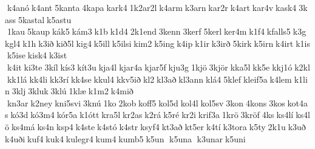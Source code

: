 k4anó k4ant 5kanta 4kapa kark4 1k2ar2l k4arm k3arn kar2r k4art kar4v kask4 3kass 5kastal k5astu  1kau 5kaup kák5 kám3 k1b k1d4 2k1end 3kenn 3kerf 5kerl ker4m k1f4 kfalls5 k3g kgl4 k1h k3ið kið5l kig4 k5ill k5ilsi kim2 k5ing k4ip k1ir k3irð 5kirk k5irn k4irt k1is k5ise kisk4 k3ist  k4it ki3te 3kíl kís3 kít3u kja4l kjar4a kjar5f kju3g 1kjö 3kjör kka5l kk5e kkj1ó k2kl kk1lá kk4li kk3rí kk4se kkul4 kkv5ið kl2 kl3að kl3ann klá4 5klef kleif5a k4lem k1lin 3klj 3kluk 3klú 1klæ k1m2 k4mið  kn3ar k2ney kni5svi 3knú 1ko 2kob koff5 kol5d kol4l kol5sv 3kon 4kons 3kos kot4as kó3d kó3m4 kór5a k1ótt kra5l kr2as k2rá k5ré kr2i krif3a 1krö 3kröf 4ks ks4lí ks4lö ks4má ks4n ksp4 k4ste k4stó k4str ksyf4 kt3að kt5er k4tí k3tora k5ty 2k1u k3uð k4uði kuf4 kuk4 kulegr4 kum4 kumb5 k5un  k5una  k3unar k5uni 
